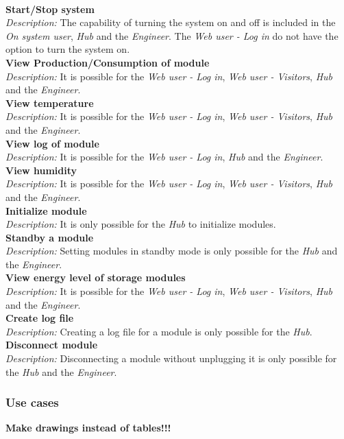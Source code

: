 	\\\textbf{Start/Stop system}
	\\\textit{Description: }
	The capability of turning the system on and off is included in the \textit{On system user}, \textit{Hub} and the \textit{Engineer}. The \textit{Web user - Log in} do not have the option to turn the system on.
	\\\textbf{View Production/Consumption of module}
	\\\textit{Description: }
	It is possible for the \textit{Web user - Log in}, \textit{Web user - Visitors}, \textit{Hub} and the \textit{Engineer}.
	\\\textbf{View temperature}
	\\\textit{Description: }
	It is possible for the \textit{Web user - Log in}, \textit{Web user - Visitors}, \textit{Hub} and the \textit{Engineer}.
	\\\textbf{View log of module}
	\\\textit{Description: }
	It is possible for the \textit{Web user - Log in}, \textit{Hub} and the \textit{Engineer}.
	\\\textbf{View humidity}
	\\\textit{Description: }
	It is possible for the \textit{Web user - Log in}, \textit{Web user - Visitors}, \textit{Hub} and the \textit{Engineer}.
	\\\textbf{Initialize module}
	\\\textit{Description: }
	It is only possible for the \textit{Hub} to initialize modules.
	\\\textbf{Standby a module}
	\\\textit{Description: }
	Setting modules in standby mode is only possible for the \textit{Hub} and the \textit{Engineer}.
	\\\textbf{View energy level of storage modules}
	\\\textit{Description: }
	It is possible for the \textit{Web user - Log in}, \textit{Web user - Visitors}, \textit{Hub} and the \textit{Engineer}.
	\\\textbf{Create log file}
	\\\textit{Description: }
	Creating a log file for a module is only possible for the \textit{Hub}.
	\\\textbf{Disconnect module}
	\\\textit{Description: }
	Disconnecting a module without unplugging it is only possible for the \textit{Hub} and the \textit{Engineer}.
\subsubsection{Use cases}
	\textbf{\Huge Make drawings instead of tables!!!}
	

